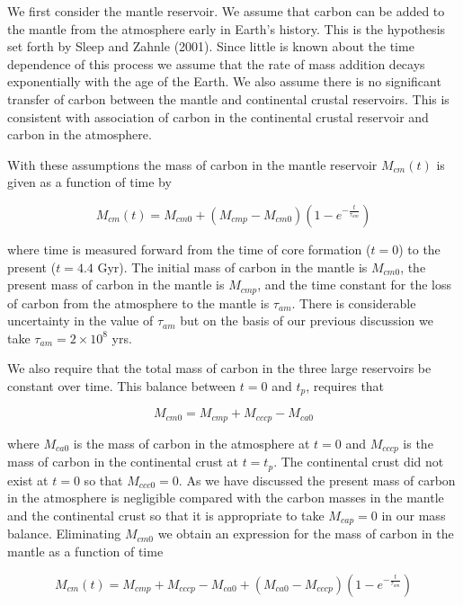 We first consider the mantle reservoir. We assume that carbon can be added to the mantle from the atmosphere early in Earth's history. This is the hypothesis set forth by Sleep and Zahnle (2001). Since little is known about the time dependence of this process we assume that the rate of mass addition decays exponentially with the age of the Earth. We also assume there is no significant transfer of carbon between the mantle and continental crustal reservoirs. This is consistent with association of carbon in the continental crustal reservoir and carbon in the atmosphere.

With these assumptions the mass of carbon in the mantle reservoir $M_{cm}(t)$ is given as a function of time by

\begin{equation}
  M_{cm}(t) = M_{cm0} + (M_{cmp} - M_{cm0}) (1 - e^{-\frac{t}{\tau_{am}}})
\end{equation}

where time is measured forward from the time of core formation ($t=0$) to the present ($t=4.4$ Gyr). The initial mass of carbon in the mantle is $M_{cm0}$, the present mass of carbon in the mantle is $M_{cmp}$, and the time constant for the loss of carbon from the atmosphere to the mantle is $\tau_{am}$. There is considerable uncertainty in the value of $\tau_{am}$ but on the basis of our previous discussion we take $\tau_{am} = 2 \times 10^8$ yrs.

We also require that the total mass of carbon in the three large reservoirs be constant over time. This balance between $t=0$ and $t_p$, requires that

\begin{equation}
  M_{cm0} = M_{cmp} + M_{cccp} - M_{ca0}
\end{equation}

where $M_{ca0}$ is the mass of carbon in the atmosphere at $t=0$ and $M_{cccp}$ is the mass of carbon in the continental crust at $t=t_p$. The continental crust did not exist at $t=0$ so that $M_{ccc0}=0$. As we have discussed the present mass of carbon in the atmosphere is negligible compared with the carbon masses in the mantle and the continental crust so that it is appropriate to take $M_{cap}=0$ in our mass balance. Eliminating $M_{cm0}$ we obtain an expression for the mass of carbon in the mantle as a function of time

\begin{equation}
  M_{cm}(t) = M_{cmp} + M_{cccp} - M_{ca0} + (M_{ca0} - M_{cccp}) (1 - e^{-\frac{t}{\tau_{am}}})
\end{equation}

